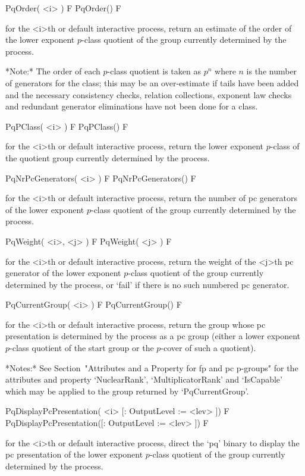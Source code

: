 \>PqOrder( <i> ) F
\>PqOrder() F

for the <i>th or default interactive {\ANUPQ} process, return an estimate
of the order of the  lower  exponent  $p$-class  quotient  of  the  group
currently determined by the process.

*Note:* The order of each $p$-class quotient is taken as $p^n$ where  $n$
is the number of generators for the class; this may be  an  over-estimate
if tails have been added and the necessary consistency  checks,  relation
collections, exponent law checks  and  redundant  generator  eliminations
have not been done for a class.

\>PqPClass( <i> ) F
\>PqPClass() F

for the <i>th or default interactive {\ANUPQ} process, return  the  lower
exponent $p$-class of the quotient  group  currently  determined  by  the
process.

\>PqNrPcGenerators( <i> ) F
\>PqNrPcGenerators() F

for the <i>th or default interactive {\ANUPQ} process, return the  number
of pc generators of the lower exponent $p$-class quotient  of  the  group
currently determined by the process.

\>PqWeight( <i>, <j> ) F
\>PqWeight( <j> ) F

for the <i>th or default interactive {\ANUPQ} process, return the  weight
of the <j>th pc generator of the lower exponent $p$-class quotient of the
group currently determined by the process, or `fail' if there is no  such
numbered pc generator.

\>PqCurrentGroup( <i> ) F
\>PqCurrentGroup() F

for the <i>th or default interactive {\ANUPQ} process, return  the  group
whose pc presentation is determined by the process as a {\GAP}  pc  group
(either a lower exponent $p$-class quotient of the  start  group  or  the
$p$-cover of such a quotient).

*Notes:*
See Section~"Attributes and a Property for fp and pc  p-groups"  for  the
attributes   and   property   `NuclearRank',   `MultiplicatorRank'    and
`IsCapable'  which  may   be   applied   to   the   group   returned   by
`PqCurrentGroup'.

\>PqDisplayPcPresentation( <i> [: OutputLevel := <lev> ]) F
\>PqDisplayPcPresentation([: OutputLevel := <lev> ]) F

for the <i>th or default interactive {\ANUPQ} process,  direct  the  `pq'
binary to display the pc presentation of  the  lower  exponent  $p$-class
quotient of the group currently determined by the process.

